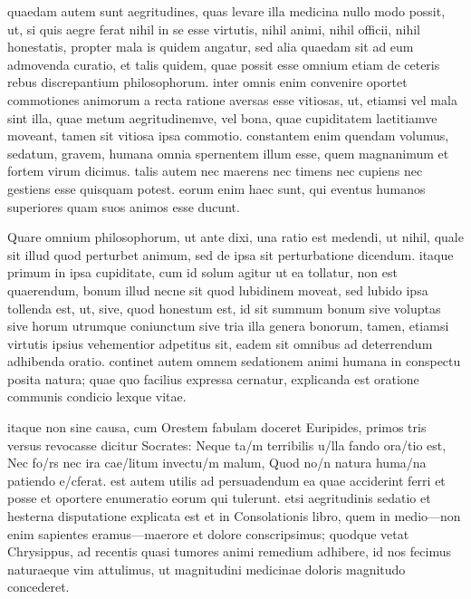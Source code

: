  quaedam autem sunt aegritudines, quas levare illa medicina nullo modo possit, ut, si quis aegre ferat nihil in se esse virtutis, nihil animi, nihil officii, nihil honestatis, propter mala is quidem angatur, sed alia quaedam sit ad eum admovenda curatio, et talis quidem, quae possit esse omnium etiam de ceteris rebus discrepantium philosophorum. inter omnis enim convenire oportet commotiones animorum a recta ratione aversas esse vitiosas, ut, etiamsi vel mala sint illa, quae metum aegritudinemve, vel bona, quae cupiditatem laetitiamve moveant, tamen sit vitiosa ipsa commotio. constantem enim quendam volumus, sedatum, gravem, humana omnia spernentem illum esse, quem magnanimum et fortem virum dicimus. talis autem nec maerens nec timens nec cupiens nec gestiens esse quisquam potest. eorum enim haec sunt, qui eventus humanos superiores quam suos animos esse ducunt.

 Quare omnium philosophorum, ut ante dixi, una ratio est medendi, ut nihil, quale sit illud quod perturbet animum, sed de ipsa sit perturbatione dicendum. itaque primum in ipsa cupiditate, cum id solum agitur ut ea tollatur, non est quaerendum, bonum illud necne sit quod lubidinem moveat, sed lubido ipsa tollenda est, ut, sive, quod honestum est, id sit summum bonum sive voluptas sive horum utrumque coniunctum sive tria illa genera bonorum, tamen, etiamsi virtutis ipsius vehementior adpetitus sit, eadem sit omnibus ad deterrendum adhibenda oratio. continet autem omnem sedationem animi humana in conspectu posita natura; quae quo facilius expressa cernatur, explicanda est oratione communis condicio lexque vitae.

 itaque non sine causa, cum Orestem fabulam doceret Euripides, primos tris versus revocasse dicitur Socrates: Neque ta/m terribilis u/lla fando ora/tio est, Nec fo/rs nec ira cae/litum invectu/m malum, Quod no/n natura huma/na patiendo e/cferat. est autem utilis ad persuadendum ea quae acciderint ferri et posse et oportere enumeratio eorum qui tulerunt. etsi aegritudinis sedatio et hesterna disputatione explicata est et in Consolationis libro, quem in medio—non enim sapientes eramus—maerore et dolore conscripsimus; quodque vetat Chrysippus, ad recentis quasi tumores animi remedium adhibere, id nos fecimus naturaeque vim attulimus, ut magnitudini medicinae doloris magnitudo concederet.


